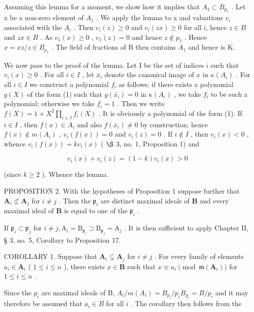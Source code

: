 Assuming this lemma for a moment, we show how it implies that \(A_{1} \subset B_{p_{1}}\) . Let x be a non-zero element of \(A_{1}\) . We apply the lemma to x and valuations \(v_{i}\) associated with the \(A_{i}\) . Then \(v_{i}(z) \geqslant 0\) and \(v_{i}(zx) \geqslant 0\) for all i, hence \(z \in B\) and \(zx \in B\) . As \(v_{1}(x) \geqslant 0\) , \(v_{1}(z) = 0\) and hence \(z \notin p_{1}\) . Hence \(x = xz/z \in B_{p_{1}}\) . The field of fractions of B then contains \(A_{1}\) and hence is K.

We now pass to the proof of the lemma. Let I be the set of indices \(i\) such that \(v_{i}(x) \geqslant 0\) . For all \(i \in I\) , let \(\bar{x}_{i}\) denote the canonical image of \(x\) in \(\kappa(A_{i})\) . For all \(i \in I\) we construct a polynomial \(f_{i}\) as follows: if there exists a polynomial \(g(X)\) of the form (1) such that \(g(\bar{x}_{i}) = 0\) in \(\kappa(A_{i})\) , we take \(f_{i}\) to be such a polynomial; otherwise we take \(f_{i} = 1\) . Then we write \(f(X) = 1 + X^{2} \prod_{i \in I} f_{i}(X)\) . It is obviously a polynomial of the form (1). If \(i \in I\) , then \(f(x) \in A_{i}\) and also \(f(\bar{x}_{i}) \neq 0\) by construction; hence \(f(x) \notin m(A_{i})\) , \(v_{i}(f(x)) = 0\) and \(v_{i}(z) = 0\) . If \(i \notin I\) , then \(v_{i}(x) < 0\) , whence \(v_{i}(f(x)) = kv_{i}(x)\) ( \(\S\) 3, no. 1, Proposition 1) and

\[
v _ {i} (x) + v _ {i} (z) = (1 - k) v _ {i} (x) > 0
\]

(since \(k \geqslant 2\) ). Whence the lemma.

PROPOSITION 2. With the hypotheses of Proposition 1 suppose further that \(\mathbf{A}_i \not\subset \mathbf{A}_j\) for \(i \neq j\) . Then the \(\mathfrak{p}_i\) are distinct maximal ideals of \(\mathbf{B}\) and every maximal ideal of \(\mathbf{B}\) is equal to one of the \(\mathfrak{p}_i\) .

If \(\mathfrak{p}_i\subset \mathfrak{p}_j\) for \(i\neq j,\mathrm{A}_i = \mathrm{B}_{\mathfrak{p}_i}\supset \mathrm{B}_{\mathfrak{p}_j} = \mathrm{A}_j\) . It is then sufficient to apply Chapter II, § 3, no. 5, Corollary to Proposition 17.

COROLLARY 1. Suppose that \(\mathbf{A}_i \subsetneq \mathbf{A}_j\) for \(i \neq j\) . For every family of elements \(a_i \in \mathbf{A}_i\) ( \(1 \leqslant i \leqslant n\) ), there exists \(x \in \mathbf{B}\) such that \(x \equiv a_i \pmod{\mathfrak{m}(\mathbf{A}_i)}\) for \(1 \leqslant i \leqslant n\) .

Since the \(p_i\) are maximal ideals of B, \(A_i / m(A_i) = B_{p_i} / p_i B_{p_i} = B / p_i\) and it may therefore be assumed that \(a_i \in B\) for all \(i\) . The corollary then follows from the

